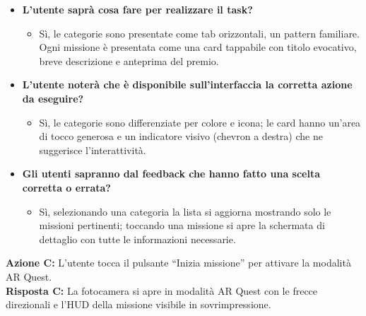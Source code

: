 \begin{itemize}[nosep, leftmargin=1.6em]
    \item \textbf{L'utente saprà cosa fare per realizzare il task?}
    \begin{itemize}[nosep, leftmargin=1.6em]
        \item Sì, le categorie sono presentate come tab orizzontali, un pattern familiare. Ogni missione è presentata come una card tappabile con titolo evocativo, breve descrizione e anteprima del premio.
    \end{itemize}
    \item \textbf{L'utente noterà che è disponibile sull'interfaccia la corretta azione da eseguire?}
    \begin{itemize}[nosep, leftmargin=1.6em]
        \item Sì, le categorie sono differenziate per colore e icona; le card hanno un'area di tocco generosa e un indicatore visivo (chevron a destra) che ne suggerisce l'interattività.
    \end{itemize}
    \item \textbf{Gli utenti sapranno dal feedback che hanno fatto una scelta corretta o errata?}
    \begin{itemize}[nosep, leftmargin=1.6em]
        \item Sì, selezionando una categoria la lista si aggiorna mostrando solo le missioni pertinenti; toccando una missione si apre la schermata di dettaglio con tutte le informazioni necessarie.
    \end{itemize}
\end{itemize}

\vspace{0.3cm}
\noindent\textbf{Azione C:} L'utente tocca il pulsante ``Inizia missione'' per attivare la modalità AR Quest.\\
\textbf{Risposta C:} La fotocamera si apre in modalità AR Quest con le frecce direzionali e l'HUD della missione visibile in sovrimpressione.

